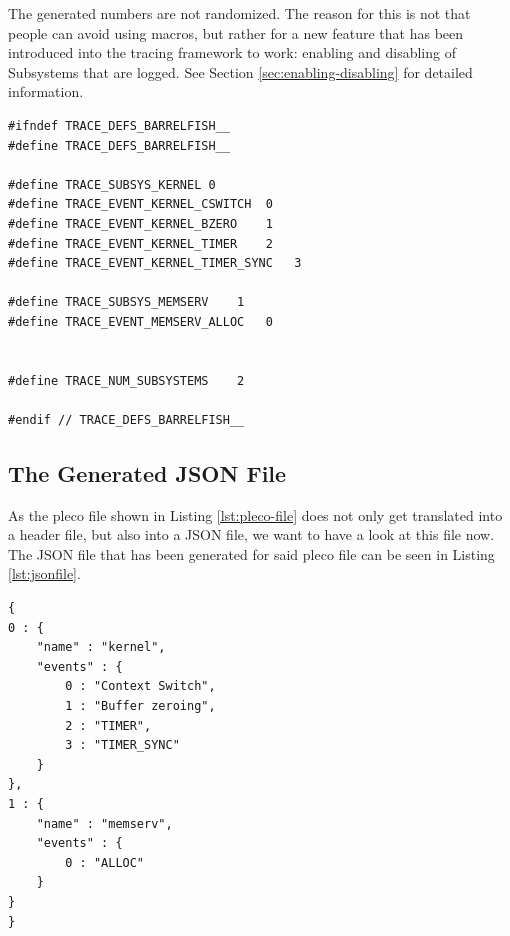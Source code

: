 \documentclass[a4paper,11pt,twoside]{report}
\begin{document}
The generated numbers are not randomized. The reason for this is not that people
can avoid using macros, but rather for a new feature that has been introduced
into the tracing framework to work: enabling and disabling of Subsystems that
are logged. See Section \ref{sec:enabling-disabling} for detailed information.

\begin{code}
\begin{lstlisting}[frame=single, caption={A header file that has been generated
	based on the pleco file shown in Listing \ref{lst:pleco-file}.}, label={lst:headerfile}]
#ifndef TRACE_DEFS_BARRELFISH__
#define TRACE_DEFS_BARRELFISH__

#define TRACE_SUBSYS_KERNEL 0
#define TRACE_EVENT_KERNEL_CSWITCH  0
#define TRACE_EVENT_KERNEL_BZERO    1
#define TRACE_EVENT_KERNEL_TIMER    2
#define TRACE_EVENT_KERNEL_TIMER_SYNC   3

#define TRACE_SUBSYS_MEMSERV    1
#define TRACE_EVENT_MEMSERV_ALLOC   0


#define TRACE_NUM_SUBSYSTEMS    2

#endif // TRACE_DEFS_BARRELFISH__

\end{lstlisting}
\end{code}

\subsection{The Generated JSON File}

As the pleco file shown in Listing  \ref{lst:pleco-file} does not only get
translated into a header file, but also into a JSON file, we want to have a look
at this file now. The JSON file that has been generated for said pleco file can
be seen in Listing \ref{lst:jsonfile}.

\begin{code}
\begin{lstlisting}[frame=single, caption={A JSON file that has been generated
	based on the pleco file shown in Listing \ref{lst:pleco-file}. This file can
be used by Aquarium to decode log traces.}, label={lst:jsonfile}]
{
0 : {
    "name" : "kernel",
    "events" : {
        0 : "Context Switch",
        1 : "Buffer zeroing",
        2 : "TIMER",
        3 : "TIMER_SYNC"
    }
},
1 : {
    "name" : "memserv",
    "events" : {
        0 : "ALLOC"
    }
}
}
\end{lstlisting}
\end{code}
\end{document}
